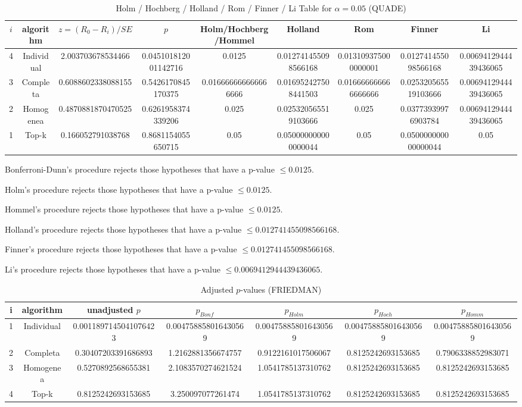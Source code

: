 \documentclass[a4paper,10pt]{article}
\begin{document}
\begin{landscape}
\begin{table}[!htp]
\centering\scriptsize
\caption{Holm / Hochberg / Holland / Rom / Finner / Li Table for $\alpha=0.05$ (QUADE)}
\begin{tabular}{ccccccccc}
$i$&algorithm&$z=(R_0 - R_i)/SE$&$p$&Holm/Hochberg/Hommel&Holland&Rom&Finner&Li\\
\hline
4&Individual&2.003703678534466&0.045101812001142716&0.0125&0.012741455098566168&0.013109375000000001&0.012741455098566168&0.0069412944439436065\\
3&Completa&0.6088602338088155&0.5426170845170375&0.016666666666666666&0.016952427508441503&0.016666666666666666&0.025320565519103666&0.0069412944439436065\\
2&Homogenea&0.4870881870470525&0.6261958374339206&0.025&0.025320565519103666&0.025&0.03773939976903784&0.0069412944439436065\\
1&Top-k&0.166052791038768&0.8681154055650715&0.05&0.050000000000000044&0.05&0.050000000000000044&0.05\\
\hline
\end{tabular}
\end{table}
Bonferroni-Dunn's procedure rejects those hypotheses that have a p-value $\le0.0125$.


Holm's procedure rejects those hypotheses that have a p-value $\le0.0125$.


Hommel's procedure rejects those hypotheses that have a p-value $\le0.0125$.


Holland's procedure rejects those hypotheses that have a p-value $\le0.012741455098566168$.


Finner's procedure rejects those hypotheses that have a p-value $\le0.012741455098566168$.


Li's procedure rejects those hypotheses that have a p-value $\le0.0069412944439436065$.



\newpage

\begin{table}[!htp]
\centering\scriptsize
\caption{Adjusted $p$-values (FRIEDMAN)}
\begin{tabular}{ccccccc}
i&algorithm&unadjusted $p$&$p_{Bonf}$&$p_{Holm}$&$p_{Hoch}$&$p_{Homm}$\\
\hline
1&Individual&0.0011897145041076423&0.004758858016430569&0.004758858016430569&0.004758858016430569&0.004758858016430569\\
2&Completa&0.30407203391686893&1.2162881356674757&0.9122161017506067&0.8125242693153685&0.7906338852983071\\
3&Homogenea&0.5270892568655381&2.1083570274621524&1.0541785137310762&0.8125242693153685&0.8125242693153685\\
4&Top-k&0.8125242693153685&3.250097077261474&1.0541785137310762&0.8125242693153685&0.8125242693153685\\
\hline
\end{tabular}
\end{table}


\end{landscape}
\end{document}
